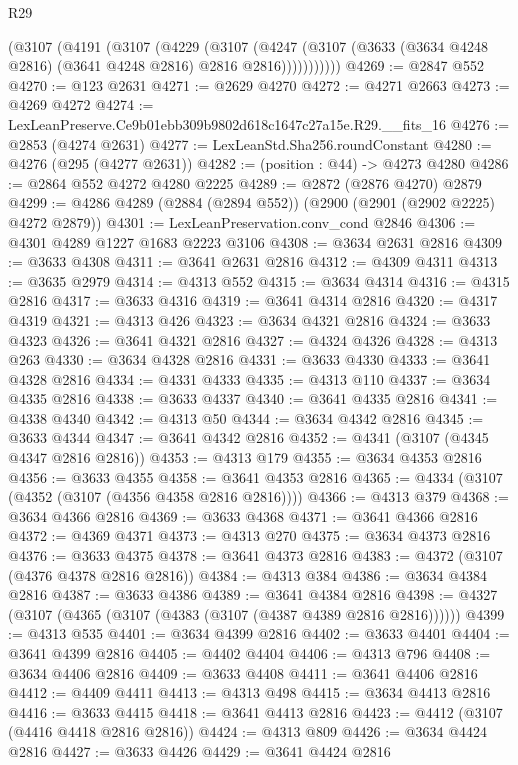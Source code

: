 \begin{lexlean}{R29}
\begin{coremodule}
          (@3107
            (@4191
              (@3107
                (@4229
                  (@3107
                    (@4247
                      (@3107 (@3633 (@3634 @4248 @2816) (@3641 @4248 @2816) @2816 @2816)))))))))))
@4269 := @2847 @552
@4270 := @123 @2631
@4271 := @2629 @4270
@4272 := @4271 @2663
@4273 := @4269 @4272
@4274 := LexLeanPreserve.Ce9b01ebb309b9802d618c1647c27a15e.R29.__fits_16
@4276 := @2853 (@4274 @2631)
@4277 := LexLeanStd.Sha256.roundConstant
@4280 := @4276 (@295 (@4277 @2631))
@4282 := (position : @44) -> @4273 @4280
@4286 := @2864 @552 @4272 @4280 @2225
@4289 := @2872 (@2876 @4270) @2879
@4299 := @4286 @4289 (@2884 (@2894 @552)) (@2900 (@2901 (@2902 @2225) @4272 @2879))
@4301 := LexLeanPreservation.conv_cond @2846
@4306 := @4301 @4289 @1227 @1683 @2223 @3106
@4308 := @3634 @2631 @2816
@4309 := @3633 @4308
@4311 := @3641 @2631 @2816
@4312 := @4309 @4311
@4313 := @3635 @2979
@4314 := @4313 @552
@4315 := @3634 @4314
@4316 := @4315 @2816
@4317 := @3633 @4316
@4319 := @3641 @4314 @2816
@4320 := @4317 @4319
@4321 := @4313 @426
@4323 := @3634 @4321 @2816
@4324 := @3633 @4323
@4326 := @3641 @4321 @2816
@4327 := @4324 @4326
@4328 := @4313 @263
@4330 := @3634 @4328 @2816
@4331 := @3633 @4330
@4333 := @3641 @4328 @2816
@4334 := @4331 @4333
@4335 := @4313 @110
@4337 := @3634 @4335 @2816
@4338 := @3633 @4337
@4340 := @3641 @4335 @2816
@4341 := @4338 @4340
@4342 := @4313 @50
@4344 := @3634 @4342 @2816
@4345 := @3633 @4344
@4347 := @3641 @4342 @2816
@4352 := @4341 (@3107 (@4345 @4347 @2816 @2816))
@4353 := @4313 @179
@4355 := @3634 @4353 @2816
@4356 := @3633 @4355
@4358 := @3641 @4353 @2816
@4365 := @4334 (@3107 (@4352 (@3107 (@4356 @4358 @2816 @2816))))
@4366 := @4313 @379
@4368 := @3634 @4366 @2816
@4369 := @3633 @4368
@4371 := @3641 @4366 @2816
@4372 := @4369 @4371
@4373 := @4313 @270
@4375 := @3634 @4373 @2816
@4376 := @3633 @4375
@4378 := @3641 @4373 @2816
@4383 := @4372 (@3107 (@4376 @4378 @2816 @2816))
@4384 := @4313 @384
@4386 := @3634 @4384 @2816
@4387 := @3633 @4386
@4389 := @3641 @4384 @2816
@4398 := @4327 (@3107 (@4365 (@3107 (@4383 (@3107 (@4387 @4389 @2816 @2816))))))
@4399 := @4313 @535
@4401 := @3634 @4399 @2816
@4402 := @3633 @4401
@4404 := @3641 @4399 @2816
@4405 := @4402 @4404
@4406 := @4313 @796
@4408 := @3634 @4406 @2816
@4409 := @3633 @4408
@4411 := @3641 @4406 @2816
@4412 := @4409 @4411
@4413 := @4313 @498
@4415 := @3634 @4413 @2816
@4416 := @3633 @4415
@4418 := @3641 @4413 @2816
@4423 := @4412 (@3107 (@4416 @4418 @2816 @2816))
@4424 := @4313 @809
@4426 := @3634 @4424 @2816
@4427 := @3633 @4426
@4429 := @3641 @4424 @2816

\end{coremodule}
\end{lexlean}
